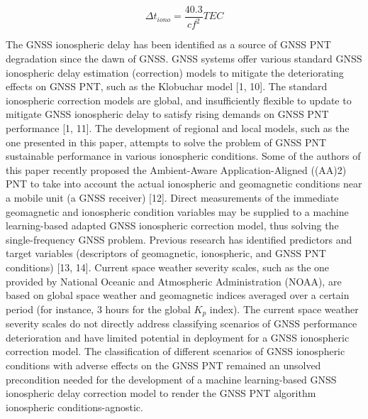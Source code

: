 \let\LaTeXcline\cline\documentclass[sn-mathphys-num]{sn-jnl}\let\cline\LaTeXcline
\begin{document}
\begin{equation}
	\Delta t_{iono} = \frac{40.3}{c f^{2}} TEC
	\label{eqn:3}
\end{equation}

The GNSS ionospheric delay has been identified as a source of GNSS PNT degradation since the dawn of GNSS. GNSS systems offer various standard GNSS ionospheric delay estimation (correction) models to mitigate the deteriorating effects on GNSS PNT, such as the Klobuchar model [1, 10]. The standard ionospheric correction models are global, and insufficiently flexible to update to mitigate GNSS ionospheric delay to satisfy rising demands on GNSS PNT performance [1, 11]. The development of regional and local models, such as the one presented in this paper, attempts to solve the problem of GNSS PNT sustainable performance in various ionospheric conditions. Some of the authors of this paper recently proposed the Ambient-Aware Application-Aligned ((AA)2) PNT to take into account the actual ionospheric and geomagnetic conditions near a mobile unit (a GNSS receiver) [12]. Direct measurements of the immediate geomagnetic and ionospheric condition variables may be supplied to a machine learning-based adapted GNSS ionospheric correction model, thus solving the single-frequency GNSS problem. Previous research has identified predictors and target variables (descriptors of geomagnetic, ionospheric, and GNSS PNT conditions) [13, 14]. Current space weather severity scales, such as the one provided by National Oceanic and Atmospheric Administration (NOAA), are based on global space weather and geomagnetic indices averaged over a certain period (for instance, $3$ hours for the global $K_{p}$ index). The current space weather severity scales do not directly address classifying scenarios of GNSS performance deterioration and have limited potential in deployment for a GNSS ionospheric correction model. The classification of different scenarios of GNSS ionospheric conditions with adverse effects on the GNSS PNT remained an unsolved precondition needed for the development of a machine learning-based GNSS ionospheric delay correction model to render the GNSS PNT algorithm ionospheric conditions-agnostic.
\end{document}
